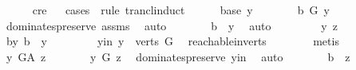 \begin{isabellebody}
\ \ \ \ \isamarkupfalse%
\ c{\isacharunderscore}{\kern0pt}re\isanewline
\ \ \isamarkupfalse%
{\isacharparenleft}{\kern0pt}cases\ \ rule{\isacharcolon}{\kern0pt}\ trancl{\isacharunderscore}{\kern0pt}induct{\isacharparenright}{\kern0pt}\isanewline
\ \ \ \ \isamarkupfalse%
\ {\isacharparenleft}{\kern0pt}base\ y{\isacharparenright}{\kern0pt}\isanewline
\ \ \ \ \isamarkupfalse%
\ \isamarkupfalse%
\ {\isachardoublequoteopen}b\ {\isasymrightarrow}\isactrlbsub G\isactrlesub \ y{\isachardoublequoteclose}\ \isamarkupfalse%
\ dominates{\isacharunderscore}{\kern0pt}preserve\ assms{\isacharparenleft}{\kern0pt}{}{\isacharparenright}{\kern0pt}\ \isamarkupfalse%
\ auto\isanewline
\ \ \ \ \isamarkupfalse%
\ \isamarkupfalse%
\ {\isachardoublequoteopen}b\ {\isasymrightarrow}\isactrlsup {\isacharplus}{\kern0pt}\ y{\isachardoublequoteclose}\ \isamarkupfalse%
\ auto\isanewline
\ \ \isamarkupfalse%
\isanewline
\ \ \ \ \isamarkupfalse%
\ y\ z\ \ \ \ \isanewline
\ \ \ \ \isamarkupfalse%
\ b{\isacharunderscore}{\kern0pt}y{\isacharcolon}{\kern0pt}\ {\isachardoublequoteopen}b\ {\isasymrightarrow}\isactrlsup {\isacharplus}{\kern0pt}\ y{\isachardoublequoteclose}\ \isanewline
\ \ \ \ \isamarkupfalse%
\ \isamarkupfalse%
\ y{\isacharunderscore}{\kern0pt}in{\isacharcolon}{\kern0pt}\ {\isachardoublequoteopen}y\ {\isasymin}\ verts\ G{\isachardoublequoteclose}\ \isamarkupfalse%
\ reachable{}{\isacharunderscore}{\kern0pt}in{\isacharunderscore}{\kern0pt}verts{\isacharparenleft}{\kern0pt}{}{\isacharparenright}{\kern0pt}\isanewline
\ \ \ \ \ \ \isamarkupfalse%
\ {\isacharparenleft}{\kern0pt}metis{\isacharparenright}{\kern0pt}\ \isanewline
\ \ \ \ \isamarkupfalse%
\ {\isachardoublequoteopen}y\ {\isasymrightarrow}\isactrlbsub G{\isacharunderscore}{\kern0pt}A\isactrlesub \ z{\isachardoublequoteclose}\isanewline
\ \ \ \ \isamarkupfalse%
\ \isamarkupfalse%
\ {\isachardoublequoteopen}y\ {\isasymrightarrow}\isactrlbsub G\isactrlesub \ z{\isachardoublequoteclose}\ \isamarkupfalse%
\ dominates{\isacharunderscore}{\kern0pt}preserve\ y{\isacharunderscore}{\kern0pt}in\ \isamarkupfalse%
\ auto\isanewline
\ \ \ \ \isamarkupfalse%
\ \isamarkupfalse%
\ {\isachardoublequoteopen}b\ {\isasymrightarrow}\isactrlsup {\isacharplus}{\kern0pt}\ z{\isachardoublequoteclose}\ \isamarkupfalse%

\end{isabellebody}
